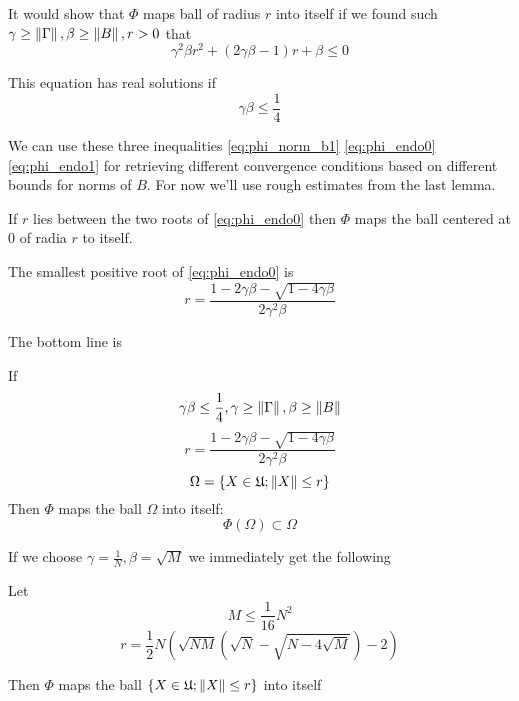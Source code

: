\documentclass{article}
\begin{document}
    It would show that $\Phi$ maps ball of radius $r$ into itself
    if we found such $\gamma\geq\left\|{\Gamma}\right\|, \beta\geq\left\|{B}\right\|, r>0$
    that
\begin{equation}\label{eq:phi_endo0}
    \gamma^2\beta r^2 + (2\gamma\beta - 1) r + \beta \leq 0
\end{equation}

This equation has real solutions if
\begin{equation}\label{eq:phi_endo1}
    \gamma\beta\leq\frac14
\end{equation}

We can use these three inequalities \eqref{eq:phi_norm_b1} \eqref{eq:phi_endo0} \eqref{eq:phi_endo1}
for retrieving different convergence conditions based on different bounds for norms of $B$.
For now we'll use rough estimates from the last lemma.

\begin{propose}
    If $r$ lies between the two roots of \eqref{eq:phi_endo0}
    then $\Phi$ maps the ball centered at $0$ of radia $r$ to itself.

    The smallest positive root of \eqref{eq:phi_endo0} is
    \begin{equation}\label{eq:endo_r0}
        r = \frac{1 - 2\gamma\beta - \sqrt{1-4\gamma\beta}}{2 \gamma^2 \beta}
    \end{equation}
\end{propose}

The bottom line is
\begin{thm}\label{thm:endo}
    If
    $$\gamma\beta\leq\frac14, \gamma\geq\left\|{\Gamma}\right\|, \beta\geq\left\|{B}\right\|$$
    $$r = \frac{1 - 2\gamma\beta - \sqrt{1-4\gamma\beta}}{2 \gamma^2 \beta}$$
    $$\Omega = \{ X\in\mathfrak U; \left\|{X}\right\| \leq r \}$$
    Then
    $\Phi$ maps the ball $\Omega$ into itself:
    $$\Phi(\Omega)\subset\Omega$$
\end{thm}

If we choose $\gamma=\frac{1}{N}, \beta=\sqrt{M}$ we immediately get the following
\begin{corollary}\label{thm:endo_nm}
    Let
    \begin{equation}\label{eq:phi_endo_nm_condition}
        M \leq \frac{1}{16} N^2
    \end{equation}
    \begin{equation}\label{eq:phi_endo_nm_radia}
        r = \frac12 N
        \left(
        \sqrt{NM}(\sqrt{N} - \sqrt{N-4\sqrt{M}}) - 2
        \right)
    \end{equation}

    Then
    $\Phi$ maps the ball $\{ X\in\mathfrak U; \left\|{X}\right\| \leq r \}$ into itself
\end{corollary}
\end{document}
